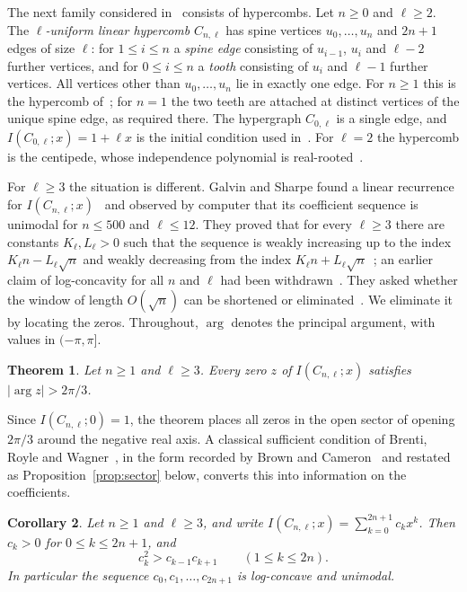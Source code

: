 \documentclass{amsart}
\newtheorem{theorem}{Theorem}[section]
\newtheorem{corollary}[theorem]{Corollary}
\theoremstyle{remark}
\numberwithin{equation}{section}
\begin{document}
The next family considered in~\cite{GS} consists of hypercombs. Let
$n\ge 0$ and $\ell\ge 2$. The \emph{$\ell$-uniform linear hypercomb}
$C_{n,\ell}$ has spine vertices $u_0,\dots,u_n$ and $2n+1$ edges of size
$\ell$: for $1\le i\le n$ a \emph{spine edge} consisting of $u_{i-1}$, $u_i$
and $\ell-2$ further vertices, and for $0\le i\le n$ a \emph{tooth}
consisting of $u_i$ and $\ell-1$ further vertices. All vertices other than
$u_0,\dots,u_n$ lie in exactly one edge. For $n\ge 1$ this is the hypercomb
of~\cite[Section~1.1]{GS}; for $n=1$ the two teeth are attached at distinct
vertices of the unique spine edge, as required there. The hypergraph
$C_{0,\ell}$ is a single edge, and $I(C_{0,\ell};x)=1+\ell x$ is the initial
condition used in~\cite[Theorem~1.7]{GS}. For $\ell=2$ the hypercomb is the
centipede, whose independence polynomial is real-rooted~\cite{Zhu}.

For $\ell\ge 3$ the situation is different. Galvin and Sharpe found a linear
recurrence for $I(C_{n,\ell};x)$~\cite[Theorem~1.7]{GS} and observed by
computer that its coefficient sequence is unimodal for $n\le 500$ and
$\ell\le 12$. They proved that for every $\ell\ge 3$ there are constants
$K_\ell,L_\ell>0$ such that the sequence is weakly increasing up to the
index $K_\ell n-L_\ell\sqrt{n}$ and weakly decreasing from the index
$K_\ell n+L_\ell\sqrt{n}$~\cite[Corollary~1.8]{GS}; an earlier claim of
log-concavity for all $n$ and $\ell$ had been withdrawn~\cite[Note~1.9]{GS}.
They asked whether the window of length $O(\sqrt{n})$ can be shortened or
eliminated~\cite[Question~1.10(4)]{GS}. We eliminate it by locating the
zeros. Throughout, $\arg$ denotes the principal argument, with values in
$(-\pi,\pi]$.

\begin{theorem}\label{thm:main}
Let $n\ge 1$ and $\ell\ge 3$. Every zero $z$ of $I(C_{n,\ell};x)$ satisfies
$|\arg z|>2\pi/3$.
\end{theorem}

Since $I(C_{n,\ell};0)=1$, the theorem places all zeros in the open sector
of opening $2\pi/3$ around the negative real axis. A classical sufficient
condition of Brenti, Royle and Wagner~\cite[Proposition~1.2]{BRW}, in the
form recorded by Brown and Cameron~\cite[Corollary~2.3]{BC} and restated as
Proposition~\ref{prop:sector} below, converts this into information on the
coefficients.

\begin{corollary}\label{cor:lc}
Let $n\ge 1$ and $\ell\ge 3$, and write
$I(C_{n,\ell};x)=\sum_{k=0}^{2n+1}c_kx^k$. Then $c_k>0$ for
$0\le k\le 2n+1$, and
\[
c_k^2>c_{k-1}c_{k+1}\qquad(1\le k\le 2n).
\]
In particular the sequence $c_0,c_1,\dots,c_{2n+1}$ is log-concave and
unimodal.
\end{corollary}
\end{document}
